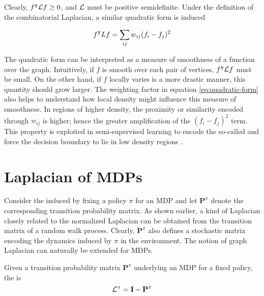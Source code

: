 Clearly, $f^\intercal \mathbf{\mathcal{L}} f \geq 0$, and $\mathbf{\mathcal{L}}$ must be positive
semidefinite. Under the definition of the combinatorial Laplacian, a similar quadratic
form is induced \parencite{Mohar91}

\begin{equation}
f^\intercal L f = \sum_{ij} w_{ij} (f_i - f_j)^2
\end{equation}

The quadratic form can be interpreted as a measure of smoothness of a  function over
the graph. Intuitively, if $f$ is smooth over each pair of vertices, $f^\intercal
\mathbf{\mathcal{L}} f$ must be small. On the other hand, if $f$ locally varies is a more drastic
manner, this quantity should grow larger. The weighting factor in equation
\ref{eq:quadratic-form} also helps to understand how local density might influence this
measure of smoothness. In regions of higher density, the proximity or similarity
encoded through $w_{ij}$ is higher; hence the greater amplification of the $(f_i - f_j)^2$
term. This property is exploited in semi-supervised learning to encode the so-called  and force the decision boundary to lie in low density regions \cite{Chapelle2002}.


\section{Laplacian of MDPs}
Consider the \mrp induced by fixing a policy $\pi$ for an MDP and let $\mathbf{P}^\pi$
denote the corresponding transition probability matrix. As shown earlier, a kind of
Laplacian closely related to the normalized Laplacian can be obtained from the transition
matrix of a random walk process. Clearly, $\mathbf{P}^\pi$ also defines a stochastic
matrix encoding the dynamics induced by $\pi$ in the environment. The notion of graph Laplacian can
naturally be extended for MDPs. 

\begin{defn}
Given a transition probability matrix $\mathbf{P}^\pi$ underlying an MDP for a fixed
policy, the  is
\begin{equation}
\mathbf{\mathcal{L}}^\pi = \mathbf{I} - \mathbf{P}^\pi
\label{eq:mdp-graph-laplacian}
\end{equation}
\end{defn} 

